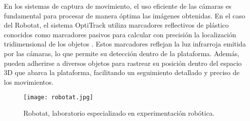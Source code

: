 En los sistemas de captura de movimiento, el uso eficiente de las cámaras es fundamental para procesar de manera óptima las imágenes obtenidas. En el caso del Robotat, el sistema OptiTrack utiliza marcadores reflectivos de plástico conocidos como marcadores pasivos para calcular con precisión la localización tridimensional de los objetos \cite{perafan_camilo_2022}. Estos marcadores reflejan la luz infrarroja emitida por las cámaras, lo que permite su detección dentro de la plataforma. Además, pueden adherirse a diversos objetos para rastrear su posición dentro del espacio 3D que abarca la plataforma, facilitando un seguimiento detallado y preciso de los movimientos.

\begin{figure}[H]
	\centering
	\texttt{[image: robotat.jpg]}
	\caption{Robotat, laboratorio especializado en experimentación robótica.}
	\label{robotat}
\end{figure}